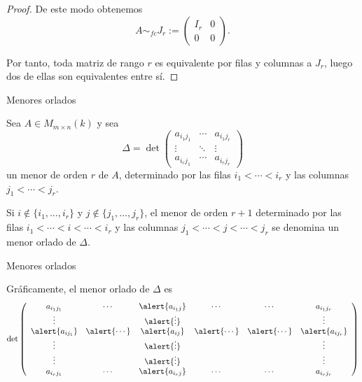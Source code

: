 \begin{frame}[allowframebreaks, t]
\begin{proof}
De este modo obtenemos
\[
A\sim_{fc}
J_r:=
\left(
\begin{array}{c|c}
I_r&0\\
\hline
0&0
\end{array}
\right).
\]

Por tanto, toda matriz de rango \(r\) es equivalente por filas y
columnas a \(J_r\), luego dos de ellas son equivalentes entre sí.
\end{proof}

\end{frame}

\begin{frame}{Menores orlados}

\begin{definition}
Sea \(A\in M_{m\times n}(k)\) y sea
\[
\Delta = \det
\begin{pmatrix}
a_{i_1j_1} & \cdots & a_{i_1j_r}\\
\vdots      & \ddots & \vdots\\
a_{i_rj_1} & \cdots & a_{i_rj_r}
\end{pmatrix}
\]
un menor de orden \(r\) de \(A\), determinado por las filas
\(i_1<\cdots<i_r\) y las columnas \(j_1<\cdots<j_r\).

\medskip

Si \(i\notin\{i_1,\ldots,i_r\}\) y
\(j\notin\{j_1,\ldots,j_r\}\), el menor de orden \(r+1\)
determinado por las filas
\(i_1<\cdots<i <\cdots <i_r\)
y las columnas
\(j_1<\cdots<j <\cdots <j_r\)
se denomina un \alert{menor orlado} de $\Delta$.
\end{definition}

\end{frame}

\begin{frame}{Menores orlados}

Gráficamente, el menor orlado de $\Delta$ es
\[
\det\left(
\begin{array}{ccccccc}
a_{i_1j_1} & \cdots & \alert{a_{i_1j}} & \cdots & \cdots & a_{i_1j_r}\\
\vdots     &        & \alert{\vdots}   &        &        & \vdots\\
\alert{a_{ij_1}} & \alert{\cdots} & \alert{a_{ij}} & \alert{\cdots} & \alert{\cdots} & \alert{a_{ij_r}}\\
\vdots     &        & \alert{\vdots}   &        &        & \vdots\\
\vdots     &        & \alert{\vdots}   &        &        & \vdots\\
a_{i_rj_1} & \cdots & \alert{a_{i_rj}} & \cdots & \cdots & a_{i_rj_r}
\end{array}
\right)
\]

\end{frame}

